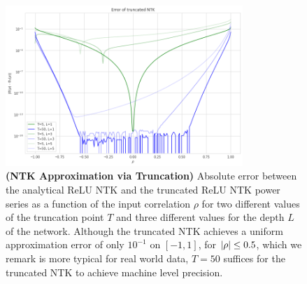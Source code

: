 \begin{figure}[ht]
    \centering
    \includegraphics[width=0.8\textwidth]{conference_files/images/error_truncated_ntk.png}
    \caption{\textbf{(NTK Approximation via Truncation)} Absolute error between the analytical ReLU NTK and the truncated ReLU NTK power series as a function of the input correlation $\rho$ for two different values of the truncation point $T$ and three different values for the depth $L$ of the network. Although the truncated NTK achieves a uniform approximation error of only $10^{-1}$ on $[-1,1]$, for $\left\lvert\rho\right\rvert \leq 0.5$, which we remark is more typical for real world data, $T=50$ suffices for the truncated NTK to achieve machine level precision.
    } 
    \label{fig:error_truncated_ntk}
\end{figure}





